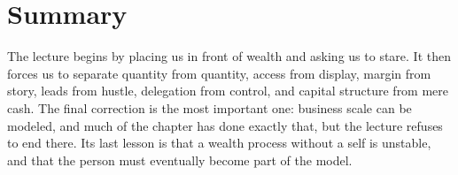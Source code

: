 \section{Summary}

The lecture begins by placing us in front of wealth and asking us to stare. It then forces us to separate quantity from quantity, access from display, margin from story, leads from hustle, delegation from control, and capital structure from mere cash. The final correction is the most important one: business scale can be modeled, and much of the chapter has done exactly that, but the lecture refuses to end there. Its last lesson is that a wealth process without a self is unstable, and that the person must eventually become part of the model.